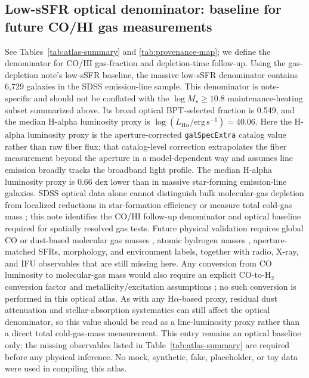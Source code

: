 \documentclass[twocolumn]{aastex631}
\begin{document}
\subsection{Low-sSFR optical denominator: baseline for future CO/HI gas measurements}
See Tables~\ref{tab:atlas-summary} and \ref{tab:provenance-map}; we define the denominator for CO/HI gas-fraction and depletion-time follow-up. Using the gas-depletion note's low-sSFR baseline, the massive low-sSFR denominator contains 6,729 galaxies in the SDSS emission-line sample. This denominator is note-specific and should not be conflated with the \(\log M_\star \geq 10.8\) maintenance-heating subset summarized above. Its broad optical BPT-selected fraction is 0.549, and the median H-alpha luminosity proxy is \(\log (L_{\mathrm{H}\alpha}/\mathrm{erg\,s^{-1}}) = 40.06\). Here the H-alpha luminosity proxy is the aperture-corrected \texttt{galSpecExtra} catalog value rather than raw fiber flux; that catalog-level correction extrapolates the fiber measurement beyond the aperture in a model-dependent way and assumes line emission broadly tracks the broadband light profile. The median H-alpha luminosity proxy is 0.66 dex lower than in massive star-forming emission-line galaxies. SDSS optical data alone cannot distinguish bulk molecular-gas depletion from localized reductions in star-formation efficiency or measure total cold-gas mass \citep{tacconi2018}; this note identifies the CO/HI follow-up denominator and optical baseline required for spatially resolved gas tests. Future physical validation requires global CO or dust-based molecular gas masses \citep[e.g., xCOLD GASS;][]{xcoldgass2017}, atomic hydrogen masses \citep[e.g., xGASS;][]{xgass2018}, aperture-matched SFRs, morphology, and environment labels, together with radio, X-ray, and IFU observables that are still missing here. Any conversion from CO luminosity to molecular-gas mass would also require an explicit CO-to-H$_2$ conversion factor and metallicity/excitation assumptions \citep{bolatto2013}; no such conversion is performed in this optical atlas. As with any H$\alpha$-based proxy, residual dust attenuation and stellar-absorption systematics can still affect the optical denominator, so this value should be read as a line-luminosity proxy rather than a direct total cold-gas-mass measurement. This entry remains an optical baseline only; the missing observables listed in Table~\ref{tab:atlas-summary} are required before any physical inference. No mock, synthetic, fake, placeholder, or toy data were used in compiling this atlas.
\end{document}
